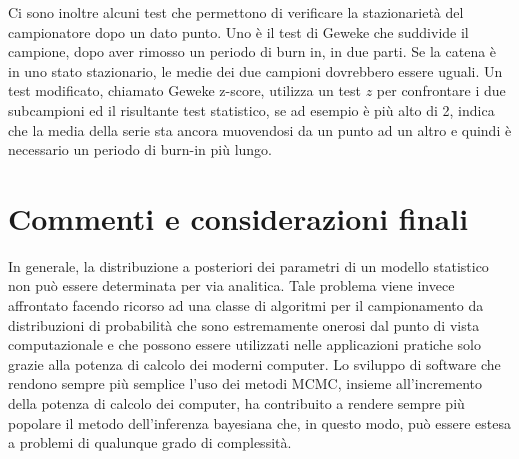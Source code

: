 \documentclass[
  11pt,
]{krantz}
\theoremstyle{definition}
\theoremstyle{definition}
\theoremstyle{definition}
\theoremstyle{definition}
\theoremstyle{remark}
\begin{document}
Ci sono inoltre alcuni test che permettono di verificare la stazionarietà del campionatore dopo un dato punto. Uno è il test di Geweke che suddivide il campione, dopo aver rimosso un periodo di burn in, in due parti. Se la catena è in uno stato stazionario, le medie dei due campioni dovrebbero essere uguali. Un test modificato, chiamato Geweke z-score, utilizza un test \(z\) per confrontare i due subcampioni ed il risultante test statistico, se ad esempio è più alto di 2, indica che la media della serie sta ancora muovendosi da un punto ad un altro e quindi è necessario un periodo di burn-in più lungo.

\hypertarget{commenti-e-considerazioni-finali-3}{%
\section*{Commenti e considerazioni finali}\label{commenti-e-considerazioni-finali-3}}


In generale, la distribuzione a posteriori dei parametri di un modello statistico non può essere determinata per via analitica. Tale problema viene invece affrontato facendo ricorso ad una classe di algoritmi per il campionamento da distribuzioni di probabilità che sono estremamente onerosi dal punto di vista computazionale e che possono essere utilizzati nelle applicazioni pratiche solo grazie alla potenza di calcolo dei moderni computer. Lo sviluppo di software che rendono sempre più semplice l'uso dei metodi MCMC, insieme all'incremento della potenza di calcolo dei computer, ha contribuito a rendere sempre più popolare il metodo dell'inferenza bayesiana che, in questo modo, può essere estesa a problemi di qualunque grado di complessità.

  

\printindex
\end{document}
